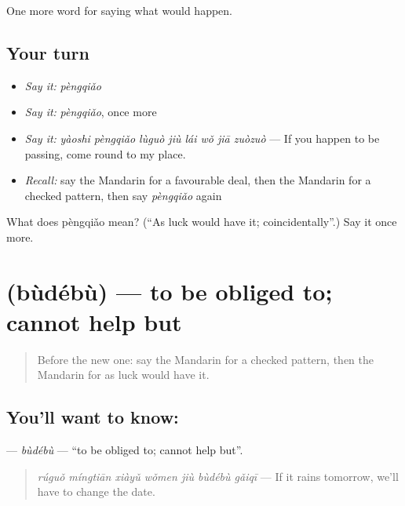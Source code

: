 \begin{grammarlens}[title={What you've built}]
One more word for saying what would happen.
\end{grammarlens}

\subsection*{Your turn}
\begin{itemize}
\raggedright
  \item \emph{Say it:} \emph{pèngqiǎo}
  \item \emph{Say it:} \emph{pèngqiǎo}, once more
  \item \emph{Say it:} \emph{yàoshi pèngqiǎo lùguò jiù lái wǒ jiā zuòzuò} — If you happen to be passing, come round to my place.
  \item \emph{Recall:} say the Mandarin for a favourable deal, then the Mandarin for a checked pattern, then say \emph{pèngqiǎo} again
\end{itemize}

\begin{tcolorbox}[breakable,colback=teal!4,colframe=teal!35!black,title={Before you move on}]
What does pèngqiǎo mean? (\textquotedblleft{}As luck would have it; coincidentally\textquotedblright{}.) Say it once more.
\end{tcolorbox}
\section[\texorpdfstring{\zh{不得不} (bùdébù)}{不得不 (bùdébù)}]{ (bùdébù) — to be obliged to; cannot help but}

\label{lesson:ZH-C528-budebu}



\begin{quote}
Before the new one: say the Mandarin for a checked pattern, then the Mandarin for as luck would have it.
\end{quote}

\subsection*{You'll want to know: }
\textbf{} — \emph{bùdébù} — \textquotedblleft{}to be obliged to; cannot help but\textquotedblright{}.

\begin{quote}
\textbf{} \emph{rúguǒ míngtiān xiàyǔ wǒmen jiù bùdébù gǎiqī} — If it rains tomorrow, we'll have to change the date.
\end{quote}

